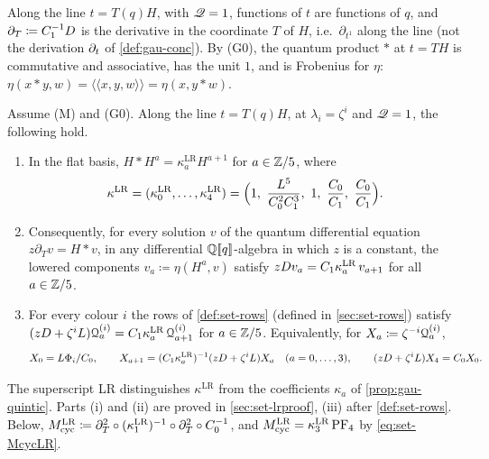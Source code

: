 
Along the line $t=T(q)H$, with $\mathscr{Q}=1$, functions of $t$ are functions of $q$, and $\partial_T\coloneqq C_1^{-1}D$ is the derivative in the coordinate $T$ of $H$, i.e.\ $\partial_{t^1}$ along the line (not the derivation $\partial_t$ of \cref{def:gau-conc}). By (G0), the quantum product $*$ at $t=TH$ is commutative and associative, has the unit $1$, and is Frobenius for $\eta$: $\eta(x*y,w)=\langle\!\langle x,y,w\rangle\!\rangle=\eta(x,y*w)$.

\begin{prop}
\label{prop:set-cyclicLR}
Assume (M) and (G0). Along the line $t=T(q)H$, at $\lambda_i=\zeta^i$ and $\mathscr{Q}=1$, the following hold.
\begin{enumerate}
\item In the flat basis, $H*H^a=\kappa^{\mathrm{LR}}_aH^{a+1}$ for $a\in\mathbb{Z}/5$, where
\[
\kappa^{\mathrm{LR}}=(\kappa^{\mathrm{LR}}_0,\dots,\kappa^{\mathrm{LR}}_4)=\Bigl(1,\ \frac{L^5}{C_0^2C_1^3},\ 1,\ \frac{C_0}{C_1},\ \frac{C_0}{C_1}\Bigr).
\]
\item Consequently, for every solution $v$ of the quantum differential equation $z\partial_Tv=H*v$, in any differential $\mathbb{Q}[\![ q ]\!]$-algebra in which $z$ is a constant, the lowered components $v_a\coloneqq\eta(H^a,v)$ satisfy $zD v_a=C_1\kappa^{\mathrm{LR}}_a\,v_{a+1}$ for all $a\in\mathbb{Z}/5$.
\item For every colour $i$ the rows of \cref{def:set-rows} (defined in \cref{sec:set-rows}) satisfy $(zD+\zeta^iL)\mathcal{Q}^{(i)}_a=C_1\kappa^{\mathrm{LR}}_a\,\mathcal{Q}^{(i)}_{a+1}$ for $a\in\mathbb{Z}/5$. Equivalently, for $X_a\coloneqq\zeta^{-i}\mathcal{Q}^{(i)}_a$,
\[
X_0=L\Phi_i/C_0,\qquad X_{a+1}=(C_1\kappa^{\mathrm{LR}}_a)^{-1}(zD+\zeta^iL)X_a\quad(a=0,\dots,3),\qquad(zD+\zeta^iL)X_4=C_0X_0 .
\]
\end{enumerate}
\end{prop}

The superscript LR distinguishes $\kappa^{\mathrm{LR}}$ from the coefficients $\kappa_a$ of \cref{prop:gau-quintic}. Parts (i) and (ii) are proved in \cref{sec:set-lrproof}, (iii) after \cref{def:set-rows}. Below, $M_{\mathrm{cyc}}^{\mathrm{LR}}\coloneqq\partial_T^2\circ(\kappa^{\mathrm{LR}}_1)^{-1}\circ\partial_T^2\circ C_0^{-1}$, and $M_{\mathrm{cyc}}^{\mathrm{LR}}=\kappa^{\mathrm{LR}}_3\,\mathrm{PF}_{4}$ by \eqref{eq:set-McycLR}.


